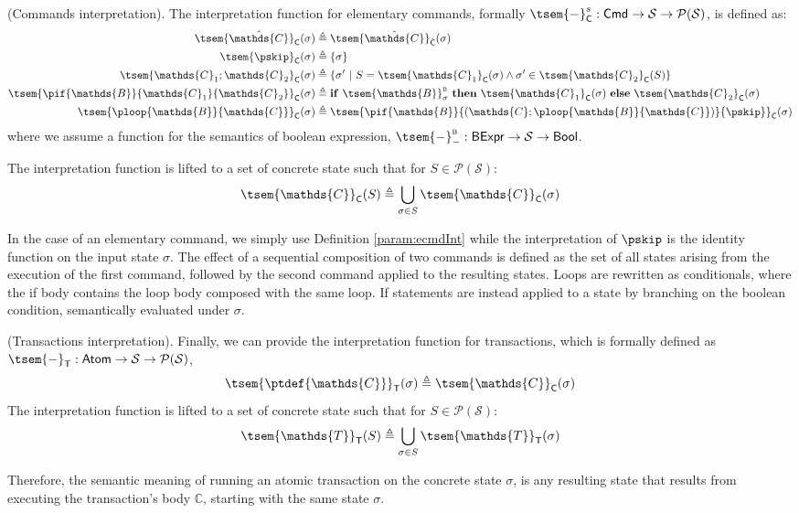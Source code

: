 \begin{defn}
	(Commands interpretation).
	The interpretation function for elementary commands, formally $\tsem{-}^s_{\mathsf{C}} : \mathsf{Cmd} \rightarrow \mathcal{S} \rightarrow \mathcal{P}(\mathcal{S})$, is defined as:
	\begin{align*}
		\tsem{\hat{\mathds{C}}}_{\mathsf{C}}(\sigma) &\triangleq \tsem{\hat{\mathds{C}}}_{\hat{\mathsf{C}}}(\sigma)
		\\
		\tsem{\pskip}_{\mathsf{C}}(\sigma) &\triangleq \{ \sigma \}
		\\
		\tsem{\mathds{C}_1 ; \mathds{C}_2}_{\mathsf{C}}(\sigma) &\triangleq \{ \sigma'\ |\ S = \tsem{\mathds{C}_1}_\mathsf{C}(\sigma) \land \sigma' \in \tsem{\mathds{C}_2}_\mathsf{C}(S) \}
		\\
		\tsem{\pif{\mathds{B}}{\mathds{C}_1}{\mathds{C}_2}}_\mathsf{C}(\sigma) &\triangleq \mathbf{if}\ \tsem{\mathds{B}}^\textsc{b}_{\sigma}\ \mathbf{then}\ \tsem{\mathds{C}_1}_\mathsf{C}(\sigma)\ \mathbf{else}\ \tsem{\mathds{C}_2}_\mathsf{C}(\sigma)
		\\
		\tsem{\ploop{\mathds{B}}{\mathds{C}}}_\mathsf{C}(\sigma) &\triangleq \tsem{\pif{\mathds{B}}{\left(\mathds{C};\ploop{\mathds{B}}{\mathds{C}}\right)}{\pskip}}_\mathsf{C}(\sigma)
	\end{align*}
	where we assume a function for the semantics of boolean expression, $\tsem{-}^\textsc{b}_{-} : \mathsf{BExpr} \rightarrow \mathcal{S} \rightarrow \mathsf{Bool}$.
	
	The interpretation function is lifted to a set of concrete state such that for $S \in \mathcal{P}(\mathcal{S})$:
	\[
		\tsem{\mathds{C}}_\mathsf{C}(S) \triangleq \bigcup_{\sigma \in S} \tsem{\mathds{C}}_\mathsf{C}(\sigma)
	\]	
\end{defn}
In the case of an elementary command, we simply use Definition \ref{param:ecmdInt} while the interpretation of $\pskip$ is the identity function on the input state $\sigma$. The effect of a sequential composition of two commands is defined as the set of all states arising from the execution of the first command, followed by the second command applied to the resulting states. Loops are rewritten as conditionals, where the if body contains the loop body composed with the same loop. If statements are instead applied to a state by branching on the boolean condition, semantically evaluated under $\sigma$.

\begin{defn}
	(Transactions interpretation).
	Finally, we can provide the interpretation function for transactions, which is formally defined as $\tsem{-}_\mathsf{T} : \mathsf{Atom} \rightarrow \mathcal{S} \rightarrow \mathcal{P}(\mathcal{S})$,
	\[
		\tsem{\ptdef{\mathds{C}}}_\mathsf{T}(\sigma) \triangleq \tsem{\mathds{C}}_\mathsf{C}(\sigma)
	\]
	The interpretation function is lifted to a set of concrete state such that for $S \in \mathcal{P}(\mathcal{S})$:
	\[
		\tsem{\mathds{T}}_\mathsf{T}(S) \triangleq \bigcup_{\sigma \in S}  \tsem{\mathds{T}}_\mathsf{T}(\sigma)
	\]
\end{defn}
Therefore, the semantic meaning of running an atomic transaction on the concrete state $\sigma$, is any resulting state that results from executing the transaction's body $\mathds{C}$, starting with the same state $\sigma$.